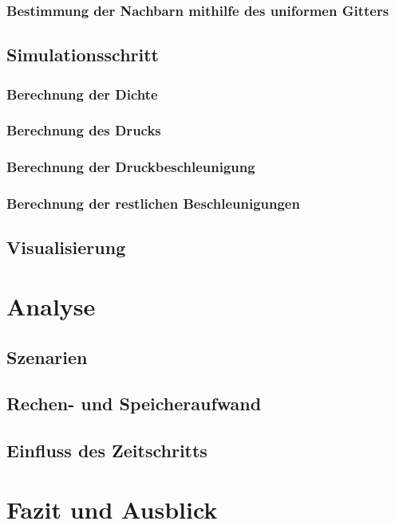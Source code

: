 \documentclass{scrreprt}
\begin{document}
\subsection{Bestimmung der Nachbarn mithilfe des uniformen Gitters}
\subsection{}
\section{Simulationsschritt}
\subsection{Berechnung der Dichte}
\subsection{Berechnung des Drucks}
\subsection{Berechnung der Druckbeschleunigung}
\subsection{Berechnung der restlichen Beschleunigungen}
\section{Visualisierung}
\chapter{Analyse}
\section{Szenarien}
\section{Rechen- und Speicheraufwand}
\section{Einfluss des Zeitschritts}
\section{}
\chapter{Fazit und Ausblick}
\end{document}
